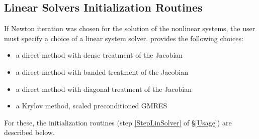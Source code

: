 
\subsection{Linear Solvers Initialization Routines}
If Newton iteration was chosen for the solution of the nonlinear systems, the 
user must specify a choice of a linear system solver. {\codeS} provides the 
following choices:
\begin{itemize}
\item a direct method with dense treatment of the Jacobian
\item a direct method with banded treatment of the Jacobian
\item a direct method with diagonal treatment of the Jacobian
\item a Krylov method, scaled preconditioned GMRES
\end{itemize}
For these, the initialization routines (step \ref{StepLinSolver} of \S\ref{Usage})
are described below.

